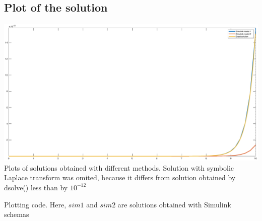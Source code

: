\documentclass[a4paper,12pt]{article}
\begin{document}
\subsection{Plot of the solution}
\begin{center}
    \includegraphics[width=\linewidth]{totalPlot.eps}
    Plots of solutions obtained with different methods. 
    Solution with symbolic Laplace transform was omited, 
    because it differs from solution obtained by dsolve()
    less than by $10^{-12}$
\end{center}
Plotting code. Here, $sim1$ and $sim2$ are solutions 
obtained with Simulink schemas

\end{document}
